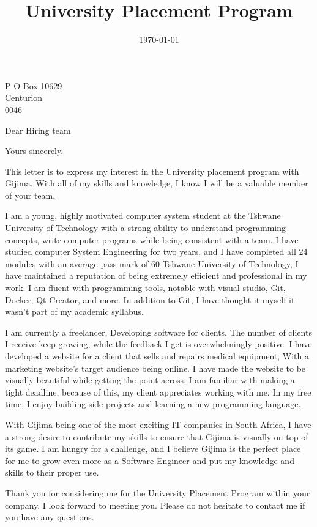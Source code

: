 \documentclass[11pt,a4paper,roman]{moderncv}        %
\title{University Placement Program}                               %
\begin{document}
 {P O Box 10629 \\ Centurion \\ 0046}
\date{\today}

\makeatletter
\renewcommand*{\makeletterclosing}{
  \@closing\\%
  {\bfseries\@firstname~\@lastname}%
  \ifthenelse{\isundefined{\@enclosure}}{}{%
    \\%
    \vfil%
    {\color{color2}\itshape\enclname: \@enclosure}}%
    \vfil}
\makeatother


\opening{Dear Hiring team}

\closing{Yours sincerely,}

\makelettertitle

This letter is to express my interest in the University placement program with
Gijima. With all of my skills and knowledge, I know I will be a valuable member
of your team.

I am a young, highly motivated computer system student at the Tshwane
University of Technology with a strong ability to understand programming
concepts, write computer programs while being consistent with a team. I have
studied computer System Engineering for two years, and I have completed all 24
modules with an average pass mark of 60%
Tshwane University of Technology, I have maintained a reputation of being
extremely efficient and professional in my work. I am fluent with programming
tools, notable with visual studio, Git, Docker, Qt Creator, and more. In
addition to Git, I have thought it myself it wasn't part of my academic
syllabus.

I am currently a freelancer, Developing software for clients. The number of
clients I receive keep growing, while the feedback I get is overwhelmingly
positive. I have developed a website for a client that sells and repairs
medical equipment, With a marketing website's target audience being online. I
have made the website to be visually beautiful while getting the point across.
I am familiar with making a tight deadline, because of this, my client
appreciates working with me.  In my free time, I enjoy building side projects
and learning a new programming language.

With Gijima being one of the most exciting IT companies in South Africa, I have
a strong desire to contribute my skills to ensure that Gijima is visually on
top of its game. I am hungry for a challenge, and I believe Gijima is the
perfect place for me to grow even more as a Software Engineer and put my
knowledge and skills to their proper use.

Thank you for considering me for the  University Placement Program within your
company. I look forward to meeting you. Please do not hesitate to contact me if
you have any questions.


\makeletterclosing
\end{document}
